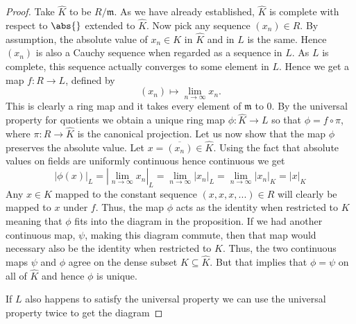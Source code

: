\documentclass{article}
\newcommand{\mfrak}[1]{\mathfrak{#1}}
\begin{document}
\begin{proof}   
    Take $\hat K$ to be $R / \mfrak m$. As we have already established, $\hat K$ is complete with respect to $\abs{}$ extended to $\hat K$. Now pick any sequence $(x_n) \in R$. By assumption, the absolute value of $x_n \in K$ in $\hat K$ and in $L$ is the same. Hence $(x_n)$ is also a Cauchy sequence when regarded as a sequence in $L$. As $L$ is complete, this sequence actually converges to some element in $L$. Hence we get a map $f : R \to L$, defined by 
    $$(x_n) \mapsto \lim_{n \to \infty} x_n.$$
    This is clearly a ring map and it takes every element of $\mfrak m$ to 0. By the universal property for quotients we obtain a unique ring map $\phi : \hat K \to L$ so that $\phi = f \circ \pi$, where $\pi : R \to \hat K$ is the canonical projection. Let us now show that the map $\phi$ preserves the absolute value. Let $x = \overline {(x_n)} \in \hat K$. Using the fact that absolute values on fields are uniformly continuous hence continuous we get 
    $$|\phi(x)|_L = |\lim_{n \to \infty} x_n|_L = \lim_{n \to \infty} |x_n|_L = \lim_{n \to \infty} |x_n|_K = |x|_K$$    
    Any $x \in K$ mapped to the constant sequence $(x,x,x, ...) \in R$ will clearly be mapped to $x$ under $f$. Thus, the map $\phi$ acts as the identity when restricted to $K$ meaning that $\phi$ fits into the diagram in the proposition. If we had another continuous map, $\psi$, making this diagram commute, then that map would necessary also be the identity when restricted to $K$. Thus, the two continuous maps $\psi$ and $\phi$ agree on the dense subset $K \subseteq \hat K$. But that implies that $\phi = \psi$ on all of $\hat K$ and hence $\phi$ is unique.
    
     
    If $L$ also happens to satisfy the universal property we can use the universal property twice to get the diagram


\end{proof}
\end{document}
